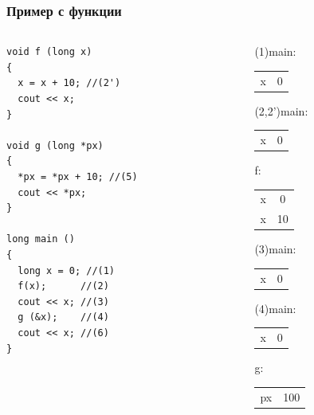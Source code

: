 \documentclass{beamer}
\begin{document}
\begin{frame}[fragile]
\frametitle{Пример с функции}
\begin{columns}[t]
  \begin{column}{0.4\textwidth}
\begin{flushleft}
\begin{lstlisting}
void f (long x)
{
  x = x + 10; //(2')
  cout << x;
}

void g (long *px)
{
  *px = *px + 10; //(5)
  cout << *px;
}

long main ()
{
  long x = 0; //(1)
  f(x);      //(2)
  cout << x; //(3)
  g (&x);    //(4)
  cout << x; //(6)
}
\end{lstlisting}
\end{flushleft}

  \end{column}
  \begin{column}{0.3\textwidth}

  (1)main:

  \begin{tabular}{c|c}
  x & 0
  \end{tabular}

\pause

  \vspace{10px}
  (2,2')main:

  \begin{tabular}{c|c}
  x & 0
  \end{tabular}

  f:

  \begin{tabular}{c|c}
  x & 0 \\\pause
  x & \alert {10}
  \end{tabular}

\pause

  \vspace{10px}
  (3)main:

  \begin{tabular}{c|c}
  x & 0
  \end{tabular}

\pause

  \vspace{10px}
  (4)main:

  \begin{tabular}{c|c}
  x & 0
  \end{tabular}

  g:

  \begin{tabular}{c|c}
  px & 100
  \end{tabular}




\end{column}
\end{columns}
\end{frame}
\end{document}
